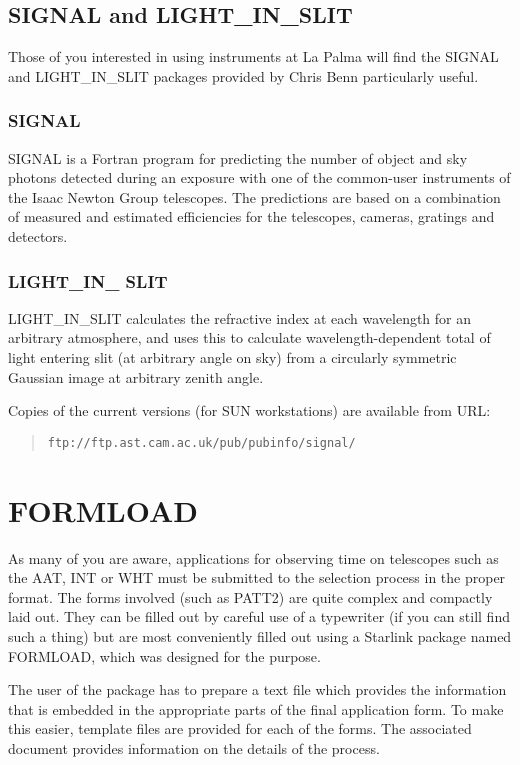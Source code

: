 \subsection{SIGNAL and LIGHT\_IN\_SLIT} 
\label{sec:signal}
Those of you interested in using instruments at La Palma will find the SIGNAL and
LIGHT\_IN\_SLIT packages provided by Chris Benn particularly useful. 

\subsubsection{SIGNAL}

SIGNAL is a Fortran program for predicting the number of object and sky
photons detected during an exposure with one of the common-user instruments
of the Isaac Newton Group telescopes. The predictions are based on a
combination of measured and estimated efficiencies for the telescopes,
cameras, gratings and detectors. 

\subsubsection{LIGHT\_IN\_ SLIT}

LIGHT\_IN\_SLIT calculates the refractive index at each wavelength for an
arbitrary atmosphere, and uses this to calculate wavelength-dependent total of
light entering slit (at arbitrary angle on sky) from a circularly symmetric
Gaussian image at arbitrary zenith angle. 

Copies of the current versions (for SUN workstations) are available
from URL:
\begin{quote}
{\tt ftp://ftp.ast.cam.ac.uk/pub/pubinfo/signal/}
\end{quote}

\section{FORMLOAD} 
\label{sec:formload}

As many of you are aware, applications for observing time on
telescopes such as the AAT, INT or WHT must be submitted to the
selection process in the proper format. The forms involved (such as PATT2)
are quite complex and compactly laid out. They can be filled out by careful
use of a typewriter (if you can still find such a thing) but are most
conveniently filled out using a Starlink package named FORMLOAD, which was 
designed for the purpose. 

The user of the package has to prepare a text file which provides the
information that is embedded in the appropriate parts of the final 
application form. To make this easier, template files are provided for each 
of the forms. The associated document {\SUNFORMref} provides information
on the details of the process. 

